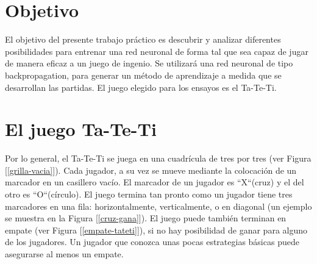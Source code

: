 \documentclass[12pt,titlepage]{article}
\begin{document}


\pagestyle{fancy}
\lhead{}
\chead{}
\rhead{}
\cfoot{}
\rfoot{\\\thepage}
\renewcommand{\headrulewidth}{0pt}



\setcounter{page}{2}

\newpage
\thispagestyle{empty}
\tableofcontents
\newpage



\section{Objetivo}
El objetivo del presente trabajo pr\'actico es descubrir y analizar diferentes posibilidades para entrenar una red neuronal de forma tal que sea capaz de jugar de manera eficaz a un juego de ingenio. Se utilizar\'a una red neuronal de tipo backpropagation, para generar un m\'etodo de aprendizaje a medida que se desarrollan las partidas. El juego elegido para los ensayos es el Ta-Te-Ti.

\section{El juego Ta-Te-Ti}
Por lo general, el Ta-Te-Ti se juega en una cuadrícula de tres por tres (ver Figura [\ref{grilla-vacia}]). Cada jugador, a su vez se mueve mediante la colocación de un marcador en un casillero vac\'io. El marcador de un jugador es ``X``(cruz) y el del otro es ``O``(c\'irculo). El juego termina tan pronto como un jugador tiene tres marcadores en una fila: horizontalmente, verticalmente, o en diagonal (un ejemplo se muestra en la Figura [\ref{cruz-gana}]). El juego puede también terminan en empate (ver Figura [\ref{empate-tateti}]), si no hay posibilidad de ganar para alguno de los jugadores.
Un jugador que conozca unas pocas estrategias b\'asicas puede asegurarse al menos un empate.
\end{document}
